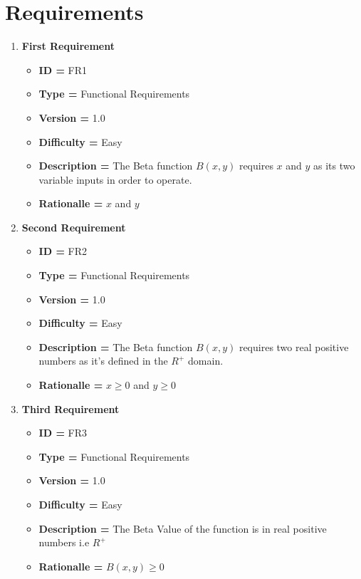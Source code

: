 \documentclass[a4paper, 12pt]{article}
\begin{document}
\section*{Requirements}
\begin{enumerate}[noitemsep]
        \item \textbf{First Requirement}
        \begin{itemize}[noitemsep]
            \item \textbf{ID = } FR1
            \item\textbf{Type = } Functional Requirements
            \item\textbf{Version = } 1.0
            \item\textbf{Difficulty = } Easy
            \item\textbf{Description = } The Beta function $B(x,y)$ requires $x$ and $y$ as its two variable inputs in order to operate.
            \item\textbf{Rationalle = } $x$ and $y$ 
        \end{itemize}
        \item \textbf{Second Requirement}
        \begin{itemize}
            \item \textbf{ID = } FR2
            \item\textbf{Type = } Functional Requirements
            \item\textbf{Version = } 1.0
            \item\textbf{Difficulty = } Easy
            \item\textbf{Description = } The Beta function $B(x,y)$ requires two real positive numbers as it's defined in the $R^{+}$ domain.
            \item\textbf{Rationalle = } $x \geq 0$ and $y \geq 0$ 
        \end{itemize}
        \item \textbf{Third Requirement}
        \begin{itemize}
            \item \textbf{ID = } FR3
            \item\textbf{Type = } Functional Requirements
            \item\textbf{Version = } 1.0
            \item\textbf{Difficulty = } Easy
            \item\textbf{Description = } The Beta Value of the function is in real positive numbers i.e $R^{+}$
            \item\textbf{Rationalle = } $B(x,y) \geq 0$ 
        \end{itemize}
        

\end{enumerate}
\end{document}

